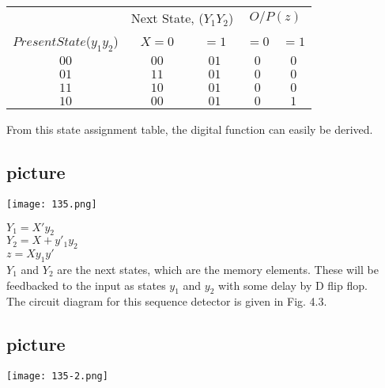 \documentclass{article}
\begin{document}
\begin{center}
\begin{tabular}{ccccc}
 \hline

 \hline

 \hline

 \hline
 &  \multicolumn{2}{c}{Next State, ($Y_1Y_2$)} &  \multicolumn{2}{c}{$O/P (z)$}  \\
  \cline{2-3}                         \cline{4-5}
 $Present State$($y_1y_2$) &  $X = 0$ & $= 1$ & $= 0$ &  $= 1$\\
\hline
$00$ & $00$ & $01$ & $0$ & $0$\\
$01$ & $11$ & $01$ & $0$ & $0$\\
$11$ & $10$ & $01$ & $0$ & $0$\\
$10$ & $00$ & $01$ & $0$ & $1$\\
 \hline

 \hline

 \hline

 \hline
\end{tabular}
\end{center}

From this state assignment table, the digital function can easily be derived.\\

\begin{center}
\section{picture}
\texttt{[image: 135.png]}
\end{center}

\hspace*{5cm} $Y_1 = X'y_2$ \\
\hspace*{5cm} $Y_2 = X + y'_1y_2$ \\
\hspace*{5cm} $z = Xy_1y'$ \\

\hspace*{0.5cm} $Y_1$ and $Y_2$ are the next states, which are the memory elements. These will be feedbacked to the input
as states $y_1$ and $y_2$ with some delay by D flip flop.\\
\hspace*{0.5cm} The circuit diagram for this sequence detector is given in Fig. 4.3.\\

\begin{center}
\section{picture}
\texttt{[image: 135-2.png]}
\end{center}
\end{document}

